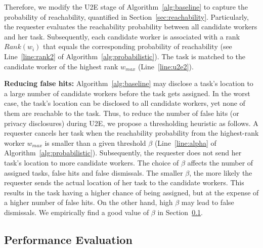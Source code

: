 \documentclass{USC-Thesis}
\numberwithin{equation}{chapter}
\begin{document}
Therefore, we modify the U2E stage of Algorithm~\ref{alg:baseline} to capture the probability of reachability, quantified in Section~\ref{sec:reachability}.
Particularly, the requester evaluates the reachability probability between all candidate workers and her task. Subsequently, each candidate worker is associated with a rank $Rank(w_i)$ that equals the corresponding probability of reachability (see Line~\ref{line:rank2} of Algorithm~\ref{alg:probabilistic}). The task is matched to the candidate worker of the highest rank $w_{max}$ (Line~\ref{line:u2e2}). 

\textbf{Reducing false hits:} Algorithm~\ref{alg:baseline} may disclose a task's location to a large number of candidate workers before the task gets assigned. In the worst case, the task's location can be disclosed to all candidate workers, yet none of them are reachable to the task. Thus, to reduce the number of false hits (or privacy disclosures) during U2E, we propose a thresholding heuristic as follows. A requester cancels her task when the reachability probability from the highest-rank worker $w_{max}$ is smaller than a given threshold $\beta$ (Line~\ref{line:alpha} of Algorithm~\ref{alg:probabilistic}). Subsequently, the requester does not send her task's location to more candidate workers. The choice of $\beta$ affects the number of assigned tasks, false hits and false dismissals. The smaller $\beta$, the more likely the requester sends the actual location of her task to the candidate workers. This results in the task having a higher chance of being assigned, but at the expense of a higher number of false hits. On the other hand, high $\beta$ may lead to false dismissals. We empirically find a good value of $\beta$ in Section~\ref{sec:evaluation}.

%
\subsection{Performance Evaluation}
\label{sec:evaluation}
\end{document}
